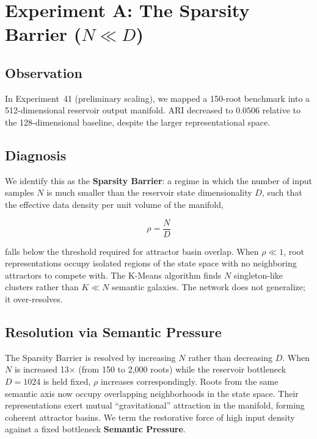 \documentclass{article}
\begin{document}
\section{Experiment A: The Sparsity Barrier ($N \ll D$)}

\subsection{Observation}

In Experiment~41 (preliminary scaling), we mapped a 150-root benchmark into a
512-dimensional reservoir output manifold. ARI decreased to $0.0506$ relative to the
128-dimensional baseline, despite the larger representational space.

\subsection{Diagnosis}

We identify this as the \textbf{Sparsity Barrier}: a regime in which the number of
input samples $N$ is much smaller than the reservoir state dimensionality $D$, such
that the effective data density per unit volume of the manifold,

\begin{equation}
  \rho = \frac{N}{D}
  \label{eq:density}
\end{equation}

falls below the threshold required for attractor basin overlap. When $\rho \ll 1$, root
representations occupy isolated regions of the state space with no neighboring
attractors to compete with. The K-Means algorithm finds $N$ singleton-like clusters
rather than $K \ll N$ semantic galaxies. The network does not generalize; it
over-resolves.

\subsection{Resolution via Semantic Pressure}

The Sparsity Barrier is resolved by increasing $N$ rather than decreasing $D$. When
$N$ is increased 13$\times$ (from 150 to 2,000 roots) while the reservoir bottleneck
$D = 1024$ is held fixed, $\rho$ increases correspondingly. Roots from the same semantic
axis now occupy overlapping neighborhoods in the state space. Their representations
exert mutual ``gravitational'' attraction in the manifold, forming coherent attractor
basins. We term the restorative force of high input density against a fixed bottleneck
\textbf{Semantic Pressure}.
\end{document}
